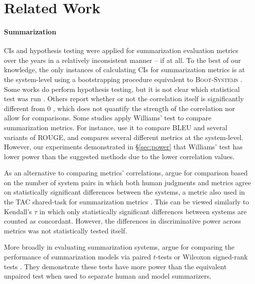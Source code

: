 \section{Related Work}
\paragraph{Summarization}
CIs and hypothesis testing were applied for summarization evaluation metrics over the years in a relatively inconsistent manner -- if at all.
To the best of our knowledge, the only instances of calculating CIs for summarization metrics is at the system-level using a bootstrapping procedure equivalent to \textsc{Boot-Systems} \citep{RankelCoSc12,DavisCoSc12}.
Some works do perform hypothesis testing, but it is not clear which statistical test was run \citep{TratzHo08, GKVS08}.
Others report whether or not the correlation itself is significantly different from 0 \citep{Lin04}, which does not quantify the strength of the correlation nor allow for comparisons.
Some studies apply Williams' test to compare summarization metrics.
For instance, \citet{Graham15} use it to compare BLEU \citep{PRWZ02} and several variants of ROUGE, and \citet{BGALN20} compares several different metrics at the system-level.
However, our experiments demonstrated in \S\ref{sec:power} that Williams' test has lower power than the suggested methods due to the lower correlation values.

As an alternative to comparing metrics' correlations, \citet{OCDN12} argue for comparison based on the number of system pairs in which both human judgments and metrics agree on statistically significant differences between the systems, a metric also used in the TAC shared-task for summarization metrics \citep[][\emph{i.a.}]{DangOw09}.
This can be viewed similarly to Kendall's $\tau$ in which only statistically significant differences between systems are counted as concordant.
However, the differences in discriminative power across metrics was not statistically tested itself.

More broadly in evaluating summarization systems, \citet{RCSO11} argue for comparing the performance of summarization models via paired $t$-tests or Wilcoxon signed-rank tests \citep{Wilcoxon92}.
They demonstrate these tests have more power than the equivalent unpaired test when used to separate human and model summarizers.

